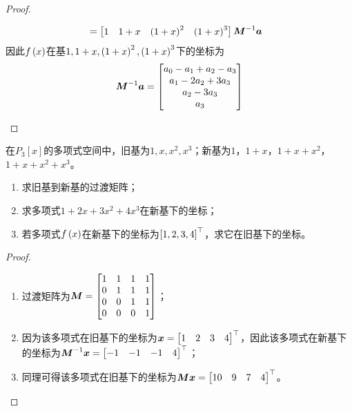 \begin{proof}
\begin{enumerate}
{\begin{align*}
                   & =
                  \begin{bmatrix}
                      1 & 1+x & \left( 1+x \right)^2 & \left( 1+x \right)^3
                  \end{bmatrix}{\boldsymbol{M}}^{-1}\boldsymbol{a}
              \end{align*}
              因此\(f\left( x \right)\)在基\(1,1+x,\left( 1+x \right)^2,\left( 1+x \right)^3\)下的坐标为
              \begin{equation*}
                  {\boldsymbol{M}}^{-1}\boldsymbol{a}=
                  \begin{bmatrix}
                      a_0-a_1+a_2-a_3 \\
                      a_1-2a_2+3a_3   \\
                      a_2-3a_3        \\
                      a_3
                  \end{bmatrix}
              \end{equation*}
              }
    \end{enumerate}
\end{proof}

\begin{problem}
在\(P_3[x]\)的多项式空间中，旧基为\(1,x,x^2,x^3\)；新基为\(1\)，\(1+x\)，\(1+x+x^2\)，\(1+x+x^2+x^3\)。
\begin{enumerate}
    \item 求旧基到新基的过渡矩阵；
    \item 求多项式\(1+2x+3x^2+4x^3\)在新基下的坐标；
    \item 若多项式\(f\left( x \right)\)在新基下的坐标为\(\left[ 1,2,3,4 \right]^\top\)，求它在旧基下的坐标。
\end{enumerate}
\end{problem}
\begin{proof}
    \begin{enumerate}
        \item 过渡矩阵为\(\boldsymbol{M}=\begin{bmatrix}1&1&1&1\\0&1&1&1\\0&0&1&1\\0&0&0&1\end{bmatrix}\)；
        \item 因为该多项式在旧基下的坐标为\(\boldsymbol{x}=\begin{bmatrix}1&2&3&4\end{bmatrix}^\top\)，因此该多项式在新基下的坐标为\({\boldsymbol{M}}^{-1}\boldsymbol{x}=\begin{bmatrix}-1&-1&-1&4\end{bmatrix}^\top\)；
        \item 同理可得该多项式在旧基下的坐标为\(\boldsymbol{M}\boldsymbol{x}=\begin{bmatrix}10&9&7&4\end{bmatrix}^\top\)。
    \end{enumerate}
\end{proof}

